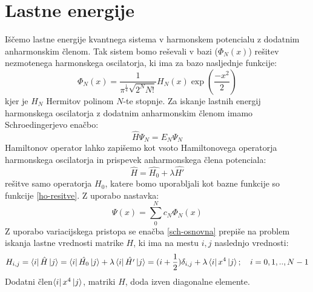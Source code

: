 \documentclass[slovene,11pt,a4paper]{article}
\numberwithin{equation}{section} %
\numberwithin{figure}{section} %
\numberwithin{table}{section} %
\begin{document}
\section{Lastne energije}
Iščemo lastne energije kvantnega sistema v harmonskem potencialu z dodatnim anharmonskim členom. Tak sistem bomo reševali v bazi ($\Phi _N(x)$) rešitev nezmotenega harmonskega oscilatorja, ki ima za bazo nasljednje funkcije:
\begin{equation}
\label{ho-resitve}
\Phi _N(x)=\frac{1}{\pi^{\frac{1}{4}}\sqrt{2^N N!}} H_N(x) \exp{(\frac{-x^2}{2})}
\end{equation} 
kjer je $H_N$ Hermitov polinom $N$-te stopnje. Za iskanje lastnih energij harmonskega oscilatorja z dodatnim anharmonskim členom imamo Schroedingerjevo enačbo:
\begin{equation}
\label{sch-osnovna}
\hat{H} \Psi_N = E_N \Psi_N
\end{equation}
Hamiltonov operator lahko zapišemo kot vsoto Hamiltonovega operatorja harmonskega oscilatorja in prispevek anharmonskega člena potenciala:
\begin{equation}
\hat{H}=\hat{H_0}+ \lambda \hat{H'}
\end{equation}
rešitve samo operatorja $H_0$, katere bomo uporabljali kot bazne funkcije so funkcije \ref{ho-resitve}. Z uporabo nastavka:
\begin{equation}
\Psi(x) = \sum _0^N c_N \Phi_N (x)
\end{equation}
Z uporabo variacijskega pristopa se enačba \ref{sch-osnovna} prepiše na problem iskanja lastne vrednosti matrike $H$, ki ima na mestu $i,j$ naslednjo vrednosti:
\begin{equation*}
H_{i,j}= \bra{i} \hat{H} \ket{j}= \bra{i}\hat{H_0} \ket{j} + \lambda \bra{i} \hat{H'} \ket{j} = (i+\frac{1}{2}) \delta_{i,j} + \lambda \bra{i}x^4 \ket{j}; \quad i=0,1,..,N-1
\end{equation*}
Dodatni člen$\bra{i}x^4 \ket{j}$, matriki $H$, doda izven diagonalne elemente.
\end{document}

